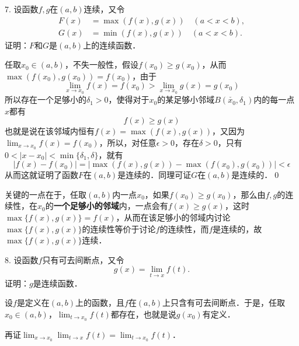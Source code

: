 7. 设函数$f, g$在$(a,b)$连续，又令
\begin{align}
    F(x) &= \max(f(x),g(x)) \quad (a < x < b), \\
    G(x) &= \min(f(x),g(x)) \quad (a < x < b).
\end{align}
证明：$F$和$G$是$(a,b)$上的连续函数．\bigskip

\prove 任取$x_0 \in (a,b)$，不失一般性，假设$f(x_0)\geq g(x_0)$，从而$\max(f(x_0),g(x_0))=f(x_0)$，由于
\begin{equation}
\displaystyle\lim_{x \to x_0} f(x) = f(x_0) > \lim_{x \to x_0} g(x) = g(x_0)
\end{equation}
所以存在一个足够小的$\delta_1 > 0$，使得对于$x_0$的某足够小邻域$B(\check{x_0},\delta_1)$内的每一点$x$都有
\begin{equation}
    f(x) \geq g(x)
\end{equation}
也就是说在该邻域内恒有$f(x)=\max(f(x),g(x))$，又因为$\displaystyle\lim_{x \to x_0} f(x) = f(x_0)$，所以，对任意$\epsilon > 0$，存在$\delta > 0$，只有$0 < \lvert x - x_0 \rvert < \min \{ \delta_1, \delta \}$，就有
\begin{equation}
    \lvert f(x) - f(x_0) \rvert = \lvert \max(f(x),g(x)) - \max(f(x_0), g(x_0)) \rvert < \epsilon
\end{equation}
从而这就证明了函数$F$在$(a,b)$是连续的．同理可证$G$在$(a,b)$是连续的．\qed\bigskip

\annotate 关键的一点在于，任取$(a,b)$内一点$x_0$，如果$f(x_0) \geq g(x_0)$，那么由$f, g$的连续性，在$x_0$的\textbf{一个足够小的邻域}内，一点会有$f(x) \geq g(x)$，这时$\max \{ f(x), g(x) \} = f(x)$，从而在该足够小的邻域内讨论$\max \{ f(x), g(x) \}$的连续性等价于讨论$f$的连续性，而$f$是连续的，故$\max \{ f(x), g(x) \}$连续．\bigskip

8. 设函数$f$只有可去间断点，又令
\begin{equation}
    g(x) = \lim_{t \to x} f(t).
\end{equation}
证明：$g$是连续函数．\bigskip

\prove 设$f$是定义在$(a,b)$上的函数，且$f$在$(a,b)$上只含有可去间断点．于是，任取$x_0 \in (a,b)$，$\displaystyle\lim_{t \to x_0} f(t)$都存在，也就是说$g(x_0)$有定义．

再证$\displaystyle\lim_{x \to x_0}\lim_{t \to x} f(t) = \lim_{t \to x_0} f(t)$．

